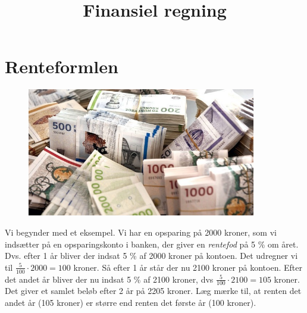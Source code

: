 \documentclass[12pt,oneside,a4paper]{article}
\title{Finansiel regning}
\date{\vspace{-5ex}}
\begin{document}
\maketitle


\section{Renteformlen}
\begin{figure}[ht]
    \centering
    \includegraphics[width=10cm]{penge}
\end{figure}

Vi begynder med et eksempel. Vi har en opsparing på 2000 kroner, som vi
indsætter på en opsparingskonto i banken, der giver en \emph{rentefod} på 5 \%
om året. Dvs.  efter 1 år bliver der indsat 5 \% af 2000 kroner på kontoen. Det
udregner vi til $ \frac{5}{100} \cdot 2000 = 100$ kroner. Så efter 1 år står
der nu 2100 kroner på kontoen.  Efter det andet år bliver der nu indsat 5 \% af
2100 kroner, dvs $ \frac{5}{100} \cdot 2100 = 105$ kroner.  Det giver et samlet
beløb efter 2 år på 2205 kroner. Læg mærke til, at renten det andet år
(105 kroner) er større end renten det første år (100 kroner).
\end{document}
